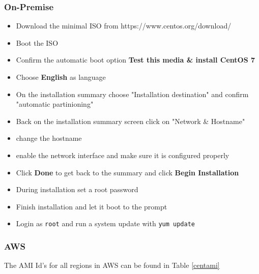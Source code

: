 \subsubsection{On-Premise}

\begin{itemize}
    \item Download the minimal ISO from https://www.centos.org/download/
    \item Boot the ISO
    \item Confirm the automatic boot option \textbf{Test this media \& install CentOS 7}
    \item Choose \textbf{English} as language
    \item On the installation summary choose "Installation destination" and confirm "automatic partinioning"
    \item Back on the installation summary screen click on "Network \& Hostname"
    \item change the hostname
    \item enable the network interface and make sure it is configured properly
    \item Click \textbf{Done} to get back to the summary and click \textbf{Begin Installation}
    \item During installation set a root password 
    \item Finish installation and let it boot to the prompt
    \item Login as \texttt{root} and run a system update with \texttt{yum update}
\end{itemize}

\subsubsection{AWS}

The AMI Id's for all regions in AWS can be found in Table \ref{centami}

